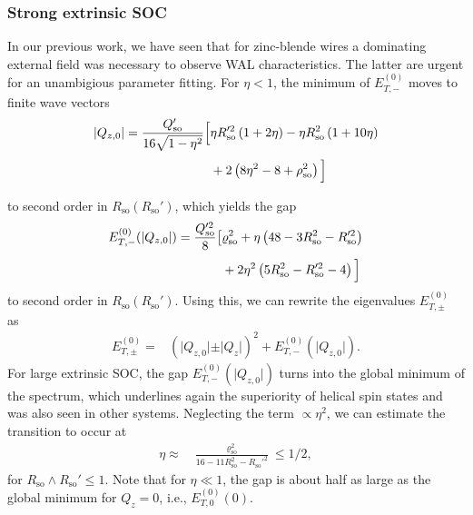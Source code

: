 \documentclass[superscriptaddress,noshowpacs,noshowkeys, twocolumn, floatfix,aps, prb,reprint]{revtex4-1}
\begin{document}
\subsubsection{Strong extrinsic SOC}\label{subsec:limit2}

In our previous work,\cite{Kammermeier2017} we have seen that for zinc-blende wires a dominating external field was necessary to observe WAL characteristics.
The latter are urgent for an unambigious parameter fitting.
For $\eta<1$,  the minimum of $E^{(0)}_{T,-}$ moves to finite wave vectors 
%
\begin{align}
\vert Q_{z,0}\vert={}&\frac{Q_\text{so}'}{16\sqrt{1-\eta^2}}\Big[\eta R_\text{so}'^2\left(1+2\eta\right)-\eta R_\text{so}^2\left(1+10\eta\right)\notag\\&\phantom{\frac{Q_\text{so}'}{16\sqrt{1-\eta^2}}\Big[}+2\left(8\eta^2-8+\rho_\text{so}^2\right)\Big]
\end{align}
%
to second order in $R_\text{so}(R_\text{so}')$, which yields the gap
%
\begin{align}
E^{(0)}_{T,-}(\vert Q_{z,0}\vert)={}&
\frac{Q_\text{so}'^2}{8}\big[\varrho_\text{so}^2+\eta\left(48-3R_\text{so}^2-R_\text{so}'^2\right)\notag\\
&\phantom{\frac{Q_\text{so}'^2}{8}\big[}+2\eta^2\left(5R_\text{so}^2-R_\text{so}'^2-4\right)\Big]
\label{Em2}
\end{align}
%
to second order in $R_\text{so}(R_\text{so}')$. 
Using this, we can rewrite the eigenvalues $E^{(0)}_{T,\pm}$ as
%
\begin{align}
E^{(0)}_{T,\pm}={}&\left(\vert Q_{z,0}\vert\pm\vert Q_z\vert\right)^2+E^{(0)}_{T,-}(\vert Q_{z,0}\vert)\label{Epm}.
\end{align}
%
For large extrinsic SOC, the gap $E^{(0)}_{T,-}(\vert Q_{z,0}\vert)$ turns into the global minimum of the spectrum, which underlines again the superiority of helical spin states and was also seen in other systems.\cite{Kettemann2007a,Schwab2006,Wenk2010,Wenk2011,Kammermeier2016,Kammermeier2016PRL,Kammermeier2017}
Neglecting the term $\propto  \eta^2$, we can estimate the transition to occur at 
%
\begin{align}
\eta\approx{}&\frac{\varrho_\text{so}^2}{16-11R_\text{so}^2-R_\text{so}'^2}\leq1/2, 
\end{align}
%
for $R_\text{so}\wedge R_\text{so}'\leq 1$.
Note that for $\eta \ll 1$,  the gap is about half as large as the global minimum for $Q_z=0$, i.e., $E^{(0)}_{T,0}(0)$.
\end{document}
